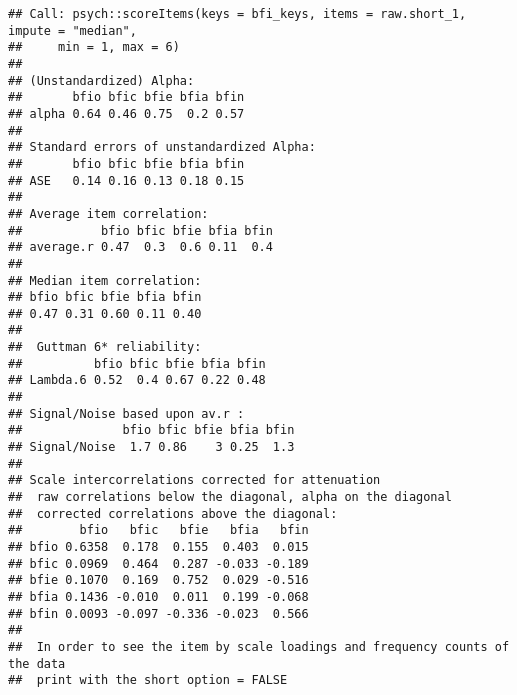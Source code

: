 \documentclass[]{article}
\begin{document}
\begin{verbatim}
## Call: psych::scoreItems(keys = bfi_keys, items = raw.short_1, impute = "median", 
##     min = 1, max = 6)
## 
## (Unstandardized) Alpha:
##       bfio bfic bfie bfia bfin
## alpha 0.64 0.46 0.75  0.2 0.57
## 
## Standard errors of unstandardized Alpha:
##       bfio bfic bfie bfia bfin
## ASE   0.14 0.16 0.13 0.18 0.15
## 
## Average item correlation:
##           bfio bfic bfie bfia bfin
## average.r 0.47  0.3  0.6 0.11  0.4
## 
## Median item correlation:
## bfio bfic bfie bfia bfin 
## 0.47 0.31 0.60 0.11 0.40 
## 
##  Guttman 6* reliability: 
##          bfio bfic bfie bfia bfin
## Lambda.6 0.52  0.4 0.67 0.22 0.48
## 
## Signal/Noise based upon av.r : 
##              bfio bfic bfie bfia bfin
## Signal/Noise  1.7 0.86    3 0.25  1.3
## 
## Scale intercorrelations corrected for attenuation 
##  raw correlations below the diagonal, alpha on the diagonal 
##  corrected correlations above the diagonal:
##        bfio   bfic   bfie   bfia   bfin
## bfio 0.6358  0.178  0.155  0.403  0.015
## bfic 0.0969  0.464  0.287 -0.033 -0.189
## bfie 0.1070  0.169  0.752  0.029 -0.516
## bfia 0.1436 -0.010  0.011  0.199 -0.068
## bfin 0.0093 -0.097 -0.336 -0.023  0.566
## 
##  In order to see the item by scale loadings and frequency counts of the data
##  print with the short option = FALSE
\end{verbatim}
\end{document}
